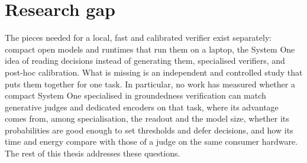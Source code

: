 \section{Research gap}
\label{sec:bg-gap}

The pieces needed for a local, fast and calibrated verifier exist separately: compact open models and runtimes that run
them on a laptop, the System One idea of reading decisions instead of generating them, specialised verifiers, and
post-hoc calibration. What is missing is an independent and controlled study that puts them together for one task. In
particular, no work has measured whether a compact System One specialised in groundedness verification can match
generative judges and dedicated encoders on that task, where its advantage comes from, among specialisation, the readout
and the model size, whether its probabilities are good enough to set thresholds and defer decisions, and how its time
and energy compare with those of a judge on the same consumer hardware. The rest of this thesis addresses these
questions.
